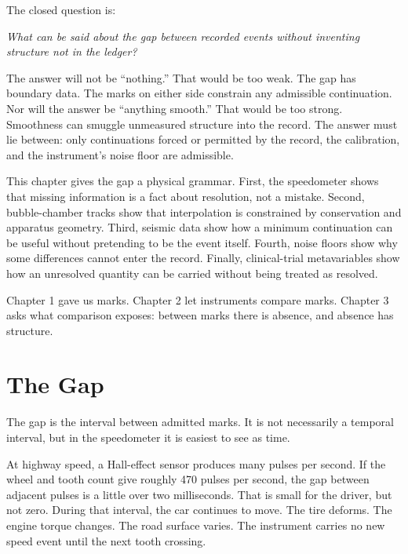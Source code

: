 \begin{chapteressay}
The closed question is:

\begin{center}
\emph{What can be said about the gap between recorded events without inventing
structure not in the ledger?}
\end{center}

The answer will not be ``nothing.'' That would be too weak. The gap has
boundary data. The marks on either side constrain any admissible continuation.
Nor will the answer be ``anything smooth.'' That would be too strong. Smoothness
can smuggle unmeasured structure into the record. The answer must lie between:
only continuations forced or permitted by the record, the calibration, and the
instrument's noise floor are admissible.

This chapter gives the gap a physical grammar. First, the speedometer shows
that missing information is a fact about resolution, not a mistake. Second,
bubble-chamber tracks show that interpolation is constrained by conservation
and apparatus geometry. Third, seismic data show how a minimum continuation can
be useful without pretending to be the event itself. Fourth, noise floors show
why some differences cannot enter the record. Finally, clinical-trial
metavariables show how an unresolved quantity can be carried without being
treated as resolved.

Chapter 1 gave us marks. Chapter 2 let instruments compare marks. Chapter 3
asks what comparison exposes: between marks there is absence, and absence has
structure.

\end{chapteressay}


\section{The Gap}
\label{se:the-gap}

The gap is the interval between admitted marks. It is not necessarily a temporal
interval, but in the speedometer it is easiest to see as time.

At highway speed, a Hall-effect sensor produces many pulses per second. If the
wheel and tooth count give roughly 470 pulses per second, the gap between
adjacent pulses is a little over two milliseconds. That is small for the driver,
but not zero. During that interval, the car continues to move. The tire deforms.
The engine torque changes. The road surface varies. The instrument carries no
new speed event until the next tooth crossing.

